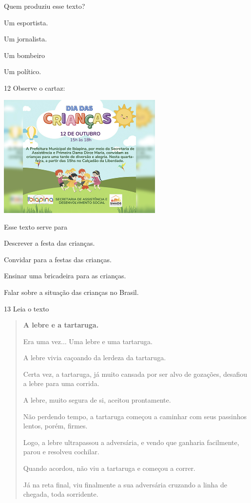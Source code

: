 Quem produziu esse texto?

\begin{escolha}
\item Um esportista.

\item Um jornalista.

\item Um bombeiro

\item Um político.
\end{escolha}

\num{12} Observe o cartaz:

\includegraphics[width=3.22436in,height=2.42060in]{media/image181.jpeg}


Esse texto serve para

\begin{escolha}
\item Descrever a festa das crianças.

\item Convidar para a festas das crianças.

\item Ensinar uma bricadeira para as crianças.

\item Falar sobre a situação das crianças no Brasil.
\end{escolha}


\num{13} Leia o texto

\begin{quote}
\textbf{A lebre e a tartaruga.}

Era uma vez... Uma lebre e uma tartaruga.

A lebre vivia caçoando da lerdeza da tartaruga.

Certa vez, a tartaruga, já muito cansada por ser alvo de gozações,
desafiou a lebre para uma corrida.

A lebre, muito segura de si, aceitou prontamente.

Não perdendo tempo, a tartaruga começou a caminhar com seus passinhos
lentos, porém, firmes.

Logo, a lebre ultrapassou a adversária, e vendo que ganharia facilmente, parou
e resolveu cochilar.

Quando acordou, não viu a tartaruga e começou a correr.

Já na reta final, viu finalmente a sua adversária cruzando a linha de
chegada, toda sorridente.
\end{quote}

